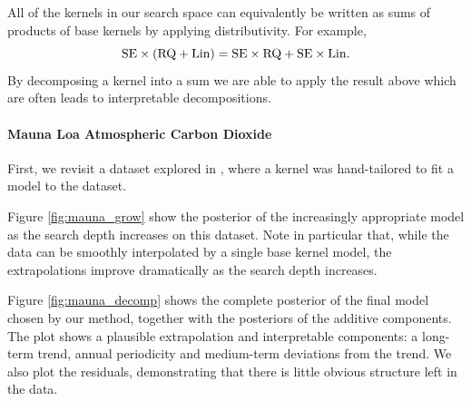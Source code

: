 \documentclass[twoside]{article}
\begin{document}
All of the kernels in our search space can equivalently be written as sums of products of base kernels by applying distributivity.
For example,
\[{\textrm{SE} \times (\textrm{RQ} + \textrm{Lin}) = \textrm{SE} \times \textrm{RQ} + \textrm{SE} \times \textrm{Lin}}.\]
By decomposing a kernel into a sum we are able to apply the result above which  are often leads to interpretable decompositions.%

\label{sec:extrapolation}
\paragraph{Mauna Loa Atmospheric Carbon Dioxide}

First, we revisit a dataset explored in \mbox{\cite{rasmussen38gaussian}}%
, where a kernel was hand-tailored to fit a \gp{} model to the dataset.

Figure \ref{fig:mauna_grow} show the posterior of the increasingly appropriate model as the search depth increases on this dataset.
Note in particular that, while the data can be smoothly interpolated by a single base kernel model, the extrapolations improve dramatically as the search depth increases.

Figure \ref{fig:mauna_decomp} shows the complete posterior of the final model chosen by our method, together with the posteriors of the additive components.
The plot shows a plausible extrapolation and interpretable components: a long-term trend, annual periodicity and medium-term deviations from the trend.
We also plot the residuals, demonstrating that there is little obvious structure left in the data.
\end{document}
